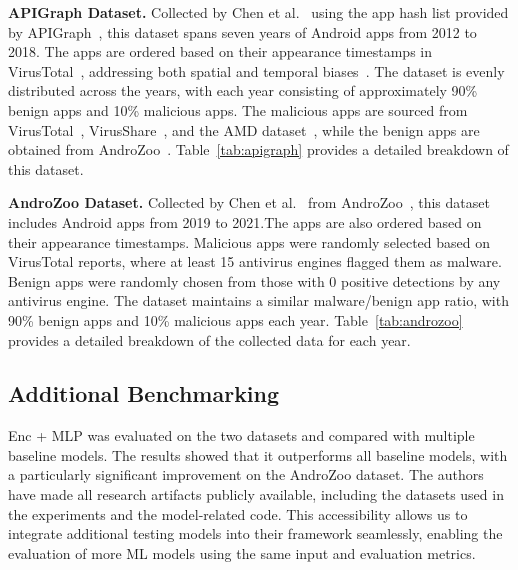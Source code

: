 \textbf{APIGraph Dataset.} Collected by Chen et
al.~\cite{Chen:USENIX23} using the app hash list provided by
APIGraph~\cite{Zhang:CCS20}, this dataset spans seven years of Android
apps from 2012 to 2018. The apps are ordered based on their appearance
timestamps in VirusTotal~\cite{VirusTotal}, addressing both spatial
and temporal biases~\cite{Pendlebury:USENIXSecurity19}. The dataset is
evenly distributed across the years, with each year consisting of
approximately 90\% benign apps and 10\% malicious apps. The malicious
apps are sourced from VirusTotal~\cite{VirusTotal},
VirusShare~\cite{VirusShare}, and the AMD dataset~\cite{AMD:dimva17},
while the benign apps are obtained from
AndroZoo~\cite{Allix:MSR16}. Table~\ref{tab:apigraph} provides a
detailed breakdown of this dataset.

\textbf{AndroZoo Dataset.} Collected by Chen et
al.~\cite{Chen:USENIX23} from AndroZoo~\cite{Allix:MSR16}, this dataset includes
Android apps from 2019 to 2021.The apps are also ordered based on their appearance
timestamps. Malicious apps were randomly selected
based on VirusTotal reports, where at least 15 antivirus engines
flagged them as malware. Benign apps were randomly chosen from those
with 0 positive detections by any antivirus engine. The dataset
maintains a similar malware/benign app ratio, with 90\%
benign apps and 10\% malicious apps each
year. Table~\ref{tab:androzoo} provides a detailed breakdown of the
collected data for each year.


\subsection{Additional Benchmarking}



Enc + MLP was evaluated on the two datasets and compared with multiple baseline
models. %
The results showed that it outperforms all
baseline models, with a particularly significant improvement on the
AndroZoo dataset. The authors have made all research
artifacts publicly available, including the datasets used in the
experiments and the model-related code. This accessibility allows us
to integrate additional testing models into their framework
seamlessly, enabling the evaluation of more ML models using the
same input and evaluation metrics.

